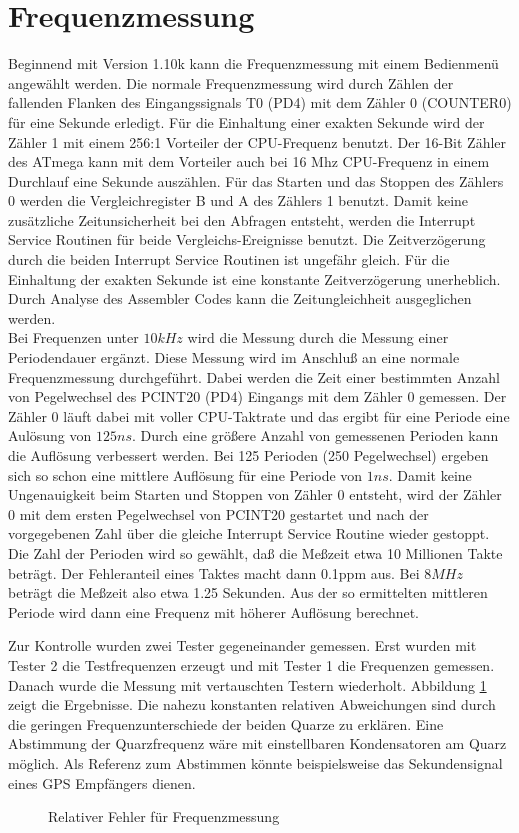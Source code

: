 
\section{Frequenzmessung}
\label{sec:frequency}

Beginnend mit Version 1.10k kann die Frequenzmessung mit einem Bedienmenü angewählt werden.
Die normale Frequenzmessung wird durch Zählen der fallenden Flanken des Eingangssignals T0 (PD4)
mit dem Zähler 0 (COUNTER0) für eine Sekunde erledigt. Für die Einhaltung einer exakten Sekunde
wird der Zähler 1 mit einem 256:1 Vorteiler der CPU-Frequenz benutzt. Der 16-Bit Zähler des ATmega
kann mit dem Vorteiler auch bei 16 Mhz CPU-Frequenz in einem Durchlauf eine Sekunde auszählen.
Für das Starten und das Stoppen des Zählers 0 werden die Vergleichregister B und A des Zählers 1
benutzt. Damit keine zusätzliche Zeitunsicherheit bei den Abfragen entsteht, werden die
Interrupt Service Routinen für beide Vergleichs-Ereignisse benutzt.
Die Zeitverzögerung durch die beiden Interrupt Service Routinen ist ungefähr gleich.
Für die Einhaltung der exakten Sekunde ist eine konstante Zeitverzögerung unerheblich.
Durch Analyse des Assembler Codes kann die Zeitungleichheit ausgeglichen werden.\\

Bei Frequenzen unter \(10 kHz\) wird die Messung durch die Messung einer Periodendauer
ergänzt. Diese Messung wird im Anschluß an eine normale Frequenzmessung durchgeführt.
Dabei werden die Zeit einer bestimmten Anzahl von Pegelwechsel des PCINT20 (PD4) Eingangs
mit dem Zähler 0 gemessen. 
Der Zähler 0 läuft dabei mit voller CPU-Taktrate und das ergibt für eine Periode eine
Aulösung von \(125 ns\). Durch eine größere Anzahl von gemessenen Perioden kann die Auflösung
verbessert werden. Bei 125 Perioden (250 Pegelwechsel) ergeben sich so schon eine mittlere
Auflösung für eine Periode von \(1 ns\). Damit keine Ungenauigkeit beim Starten und
Stoppen von Zähler 0 entsteht, wird der Zähler 0 mit dem ersten Pegelwechsel von
PCINT20 gestartet und nach der vorgegebenen Zahl über die gleiche Interrupt Service Routine
wieder gestoppt.
Die Zahl der Perioden wird so gewählt, daß die Meßzeit etwa 10 Millionen Takte beträgt.
Der Fehleranteil eines Taktes macht dann 0.1ppm aus.
Bei \(8MHz\) beträgt die Meßzeit also etwa 1.25 Sekunden.
Aus der so ermittelten mittleren Periode wird dann eine Frequenz mit höherer Auflösung berechnet.

Zur Kontrolle wurden zwei Tester gegeneinander gemessen.
Erst wurden mit Tester 2 die Testfrequenzen erzeugt und mit Tester 1 die Frequenzen gemessen.
Danach wurde die Messung mit vertauschten Testern wiederholt.
Abbildung \ref{fig:freq-ppm} zeigt die Ergebnisse.
Die nahezu konstanten relativen Abweichungen sind durch die geringen Frequenzunterschiede der beiden Quarze zu erklären.
Eine Abstimmung der Quarzfrequenz wäre mit einstellbaren Kondensatoren am Quarz möglich.
Als Referenz zum Abstimmen könnte beispielsweise das Sekundensignal eines GPS Empfängers dienen.

\begin{figure}[H]
\centering

\caption{Relativer Fehler für Frequenzmessung }
\label{fig:freq-ppm}
\end{figure}

